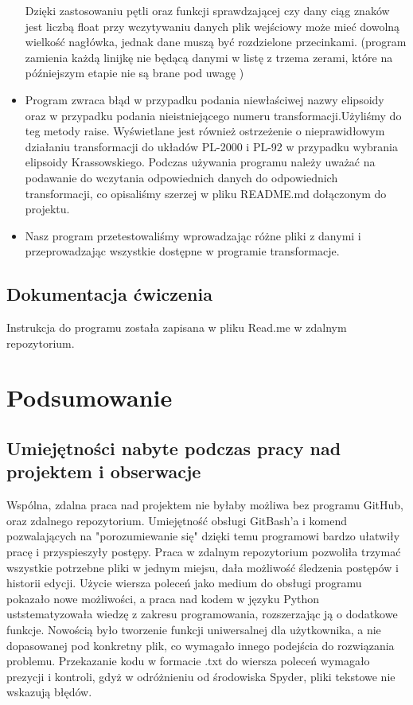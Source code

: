 \documentclass[10pt,a4paper]{article}
\begin{document}
\begin{itemize}
	Dzięki zastosowaniu pętli oraz funkcji sprawdzającej czy dany ciąg znaków jest liczbą float przy wczytywaniu danych plik wejściowy może mieć dowolną wielkość nagłówka, jednak dane muszą być rozdzielone przecinkami. (program zamienia każdą linijkę nie będącą danymi w listę z trzema zerami, które na późniejszym etapie nie są brane pod uwagę )
	\item Program zwraca błąd w przypadku podania niewłaściwej nazwy elipsoidy oraz w przypadku podania nieistniejącego numeru transformacji.Użyliśmy do teg metody raise. Wyświetlane jest również ostrzeżenie o nieprawidłowym działaniu transformacji do układów PL-2000 i PL-92 w przypadku wybrania elipsoidy Krassowskiego. Podczas używania programu należy uważać na podawanie do wczytania odpowiednich danych do odpowiednich transformacji, co opisaliśmy szerzej w pliku README.md dołączonym do projektu.
	\item Nasz program przetestowaliśmy wprowadzając różne pliki z danymi i przeprowadzając wszystkie dostępne w programie transformacje.
\end{itemize}
\subsection{Dokumentacja ćwiczenia}
Instrukcja do programu została zapisana w pliku Read.me w zdalnym repozytorium.
\section{Podsumowanie}
\subsection{Umiejętności nabyte podczas pracy nad projektem i obserwacje}
Wspólna, zdalna praca nad projektem nie byłaby możliwa bez programu GitHub, oraz zdalnego repozytorium. Umiejętność obsługi GitBash'a i komend pozwalających na "porozumiewanie się" dzięki temu programowi bardzo ułatwiły pracę i przyspieszyły postępy. Praca w zdalnym repozytorium pozwoliła trzymać wszystkie potrzebne pliki w jednym miejsu, dała możliwość śledzenia postępów i historii edycji.
\newline 
Użycie wiersza poleceń jako medium do obsługi programu pokazało nowe możliwości, a praca nad kodem w języku Python uststematyzowała wiedzę z zakresu programowania, rozszerzając ją o dodatkowe funkcje. Nowością było tworzenie funkcji uniwersalnej dla użytkownika, a nie dopasowanej pod konkretny plik, co wymagało innego podejścia do rozwiązania problemu. Przekazanie kodu w formacie .txt do wiersza poleceń wymagało prezycji i kontroli, gdyż w odróżnieniu od środowiska Spyder, pliki tekstowe nie wskazują błędów.
\end{document}
